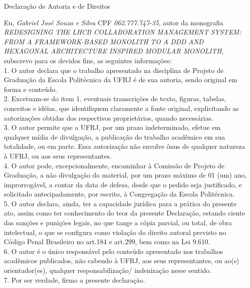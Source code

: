 \begin{center}
Declaração de Autoria e de Direitos
\end{center}

\vspace{0.5cm}

Eu, \emph{Gabriel José Souza e Silva} CPF \emph{062.777.747-35}, autor da monografia \emph{REDESIGNING THE LHCB COLLABORATION MANAGEMENT SYSTEM: FROM A FRAMEWORK-BASED MONOLITH TO A DDD AND HEXAGONAL ARCHITECTURE INSPIRED MODULAR MONOLITH}, subscrevo para os devidos fins, as seguintes informações:\\
1. O autor declara que o trabalho apresentado na disciplina de Projeto de Graduação da Escola Politécnica da UFRJ é de sua autoria, sendo original em forma e conteúdo.\\
2. Excetuam-se do item 1. eventuais transcrições de texto, figuras, tabelas, conceitos e idéias, que identifiquem claramente a fonte original, explicitando as autorizações obtidas dos respectivos proprietários, quando necessárias.\\
3. O autor permite que a UFRJ, por um prazo indeterminado, efetue em qualquer mídia de divulgação, a publicação do trabalho acadêmico em sua totalidade, ou em parte. Essa autorização não envolve ônus de qualquer natureza à UFRJ, ou aos seus representantes.\\
4. O autor pode, excepcionalmente, encaminhar à Comissão de Projeto de Graduação, a não divulgação do material, por um prazo máximo de 01 (um) ano, improrrogável, a contar da data de defesa, desde que o pedido seja justificado, e solicitado antecipadamente, por escrito, à Congregação da Escola Politécnica.\\
5. O autor declara, ainda, ter a capacidade jurídica para a prática do presente ato, assim como ter conhecimento do teor da presente Declaração, estando ciente das sanções e punições legais, no que tange a cópia parcial, ou total, de obra intelectual, o que se configura como violação do direito autoral previsto no Código Penal Brasileiro no art.184 e art.299, bem como na Lei 9.610.\\
6. O autor é o único responsável pelo conteúdo apresentado nos trabalhos acadêmicos publicados, não cabendo à UFRJ, aos seus representantes,  ou ao(s) orientador(es), qualquer responsabilização/ indenização nesse sentido.\\
7. Por ser verdade, firmo a presente declaração.\\

      \vspace{0.5cm}
      \begin{flushright}
         \parbox{10cm}{
            \hrulefill

            \vspace{-.375cm}

            \vspace{0.1cm}
         }
      \end{flushright}
      
